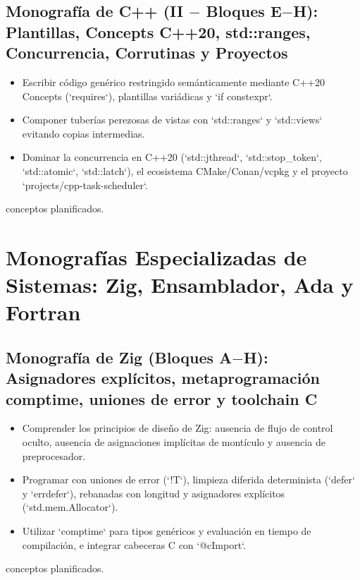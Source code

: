 \documentclass{book}
\begin{document}
\subsection*{\checkmark Monografía de C++ (II \(-\) Bloques E\(-\)H): Plantillas, Concepts C++20, std::ranges, Concurrencia, Corrutinas y Proyectos}
\begin{itemize}
\item Escribir código genérico restringido semánticamente mediante C++20 Concepts (`requires`), plantillas variádicas y `if constexpr`.
\item Componer tuberías perezosas de vistas con `std::ranges` y `std::views` evitando copias intermedias.
\item Dominar la concurrencia en C++20 (`std::jthread`, `std::stop\_token`, `std::atomic`, `std::latch`), el ecosistema CMake/Conan/vcpkg y el proyecto `projects/cpp-task-scheduler`.
\end{itemize}
 conceptos planificados.

\section*{Monografías Especializadas de Sistemas: Zig, Ensamblador, Ada y Fortran}

\subsection*{\checkmark Monografía de Zig (Bloques A\(-\)H): Asignadores explícitos, metaprogramación comptime, uniones de error y toolchain C}
\begin{itemize}
\item Comprender los principios de diseño de Zig: ausencia de flujo de control oculto, ausencia de asignaciones implícitas de montículo y ausencia de preprocesador.
\item Programar con uniones de error (`!T`), limpieza diferida determinista (`defer` y `errdefer`), rebanadas con longitud y asignadores explícitos (`std.mem.Allocator`).
\item Utilizar `comptime` para tipos genéricos y evaluación en tiempo de compilación, e integrar cabeceras C con `@cImport`.
\end{itemize}
 conceptos planificados.
\end{document}
